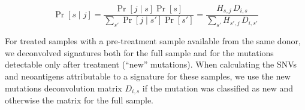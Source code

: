 \[
\Pr[s \mid j] = \frac{\Pr[j \mid s] \Pr[s]}{\sum_{s'}{\Pr[j \mid s']\Pr[s']}} = \frac{H_{s,j} \, D_{i,s}}{\sum_{s'}{H_{s',j} \, D_{i,s'}}}
\]

For treated samples with a pre-treatment sample available from the same donor, we deconvolved signatures both for the full sample and for the mutations detectable only after treatment (``new'' mutations). When calculating the SNVs and neoantigens attributable to a signature for these samples, we use the new mutations deconvolution matrix $D_{i,s}$ if the mutation was classified as new and otherwise the matrix for the full sample.
